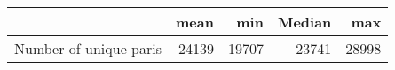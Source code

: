 \begin{tabular}{lrrrr}
\toprule
{} &   mean &    min &  Median &    max \\
\midrule
Number of unique paris &  24139 &  19707 &   23741 &  28998 \\
\bottomrule
\end{tabular}
